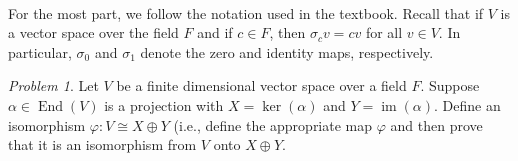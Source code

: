 \documentclass[11pt]{paper}
\theoremstyle{remark}
\newtheorem{problem}{Problem}
\newcommand{\<}{\ensuremath{\langle}}
\renewcommand{\>}{\ensuremath{\rangle}}
\newcommand\End{\ensuremath{\operatorname{End}}}
\newcommand\im{\ensuremath{\operatorname{im}}}
\begin{document}
\\[4pt]
For the most part, we follow the notation used in the textbook.
Recall that if $V$ is a vector space over the field $F$ and if
$c\in F$, then $\sigma_c v = cv$ for all $v \in V$.
In particular, $\sigma_0$ and $\sigma_1$ denote the zero and identity maps,
respectively. 
\newpage

\begin{problem} Let $V$ be a finite dimensional vector space over a field $F$.
Suppose $\alpha \in \End(V)$ is a projection with $X = \ker(\alpha)$ and $Y = \im(\alpha)$.
Define an isomorphism $\varphi: V \cong X \oplus Y$ (i.e., define the
appropriate map $\varphi$ and then prove that it is an isomorphism from 
$V$ onto $X \oplus Y$.
\end{problem}
\probskip
\end{document}

